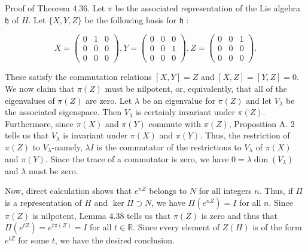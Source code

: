 \documentclass[10pt, letterpaper]{article}
\begin{document}
Proof of Theorem 4.36. Let $\pi$ be the associated representation of the Lie algebra $\mathfrak{h}$ of $H$. Let $\{X, Y, Z\}$ be the following basis for $\mathfrak{h}$ :

$$
X=\left(\begin{array}{lll}
0 & 1 & 0 \\
0 & 0 & 0 \\
0 & 0 & 0
\end{array}\right), Y=\left(\begin{array}{lll}
0 & 0 & 0 \\
0 & 0 & 1 \\
0 & 0 & 0
\end{array}\right), Z=\left(\begin{array}{lll}
0 & 0 & 1 \\
0 & 0 & 0 \\
0 & 0 & 0
\end{array}\right) .
$$

These satisfy the commutation relations $[X, Y]=Z$ and $[X, Z]=[Y, Z]=0$.\\
We now claim that $\pi(Z)$ must be nilpotent, or, equivalently, that all of the eigenvalues of $\pi(Z)$ are zero. Let $\lambda$ be an eigenvalue for $\pi(Z)$ and let $V_{\lambda}$ be the associated eigenspace. Then $V_{\lambda}$ is certainly invariant under $\pi(Z)$. Furthermore, since $\pi(X)$ and $\pi(Y)$ commute with $\pi(Z)$, Proposition A. 2 tells us that $V_{\lambda}$ is invariant under $\pi(X)$ and $\pi(Y)$. Thus, the restriction of $\pi(Z)$ to $V_{\lambda}$-namely, $\lambda I$ is the commutator of the restrictions to $V_{\lambda}$ of $\pi(X)$ and $\pi(Y)$. Since the trace of a commutator is zero, we have $0=\lambda \operatorname{dim}\left(V_{\lambda}\right)$ and $\lambda$ must be zero.

Now, direct calculation shows that $e^{n Z}$ belongs to $N$ for all integers $n$. Thus, if $\Pi$ is a representation of $H$ and $\operatorname{ker} \Pi \supset N$, we have $\Pi\left(e^{n Z}\right)=I$ for all $n$. Since $\pi(Z)$ is nilpotent, Lemma 4.38 tells us that $\pi(Z)$ is zero and thus that $\Pi\left(e^{t Z}\right)= e^{t \pi(Z)}=I$ for all $t \in \mathbb{R}$. Since every element of $Z(H)$ is of the form $e^{t Z}$ for some $t$, we have the desired conclusion.
\end{document}
